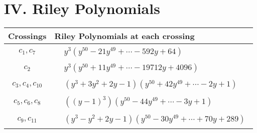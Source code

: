 \documentclass[1p]{elsarticle_modified}
\theoremstyle{definition}
\begin{document}
\centering \section*{ IV. Riley Polynomials}
\begin{tabular}{m{50pt}|m{274pt}}
Crossings & \hspace{64pt}Riley Polynomials at each crossing \\
\hline $$\begin{aligned}c_{1},c_{7}\end{aligned}$$&$\begin{aligned}
&y^3(y^{50}-21 y^{49}+\cdots-592 y+64)
\end{aligned}$\\
\hline $$\begin{aligned}c_{2}\end{aligned}$$&$\begin{aligned}
&y^3(y^{50}+11 y^{49}+\cdots-19712 y+4096)
\end{aligned}$\\
\hline $$\begin{aligned}c_{3},c_{4},c_{10}\end{aligned}$$&$\begin{aligned}
&(y^3+3 y^2+2 y-1)(y^{50}+42 y^{49}+\cdots-2 y+1)
\end{aligned}$\\
\hline $$\begin{aligned}c_{5},c_{6},c_{8}\end{aligned}$$&$\begin{aligned}
&((y-1)^3)(y^{50}-44 y^{49}+\cdots-3 y+1)
\end{aligned}$\\
\hline $$\begin{aligned}c_{9},c_{11}\end{aligned}$$&$\begin{aligned}
&(y^3- y^2+2 y-1)(y^{50}-30 y^{49}+\cdots+70 y+289)
\end{aligned}$\\
\hline
\end{tabular}
\vskip 2pc
\end{document}
